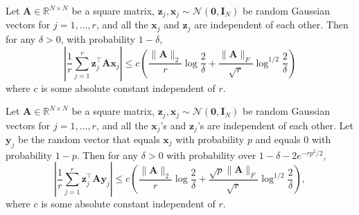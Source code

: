 \documentclass[10pt,a4paper]{amsart}
\newcommand{\B}{\mathbf}
\begin{document}
\begin{lemma}\label{lm:off} Let $\B{A}\in \mathbb{R}^{N \times N}$ be a square matrix, $\B{z}_j, \B{x}_j\sim \mathcal{N}(\B{0},\B{I}_N)$ be random Gaussian vectors for $j=1,\ldots,r$, and all the $\B{x}_j$ and $\B{z}_j$ are independent of each other. Then for any $\delta > 0$, with probability $1-\delta$,
\[
\left|\frac{1}{r} \sum\limits_{j=1}^{r} \B{z}_j^{\top}\B{A}\B{x}_j \right| \leq c \left( \frac{\|\B{A}\|_2}{r}\log \frac{2}{\delta} + \frac{\|\B{A}\|_F}{\sqrt r}\log^{1/2} \frac{2}{\delta}\right)
\]
where $c$ is some absolute constant independent of $r$.
\end{lemma}

\begin{lemma}\label{lm:off2} Let $\B{A}\in \mathbb{R}^{N \times N}$ be a square matrix, $\B{z}_j, \B{x}_j\sim \mathcal{N}(\B{0},\B{I}_N)$ be random Gaussian vectors for $j=1,\ldots,r$, and all the $\B{x}_j$'s and $\B{z}_j$'s are independent of each other. Let $\B{y}_j$ be the random vector that equals $\B{x}_j$ with probability $p$ and equals $0$ with probability $1-p$. Then for any $\delta>0$ with probability over $1-\delta-2e^{-rp^2/2}$,
\[
\left|\frac{1}{r} \sum\limits_{j=1}^{r} \B{z}_j^{\top}\B{A}\B{y}_j \right| \leq c \left( \frac{\|\B{A}\|_2}{r}\log \frac{2}{\delta} + \frac{\sqrt p \|\B{A}\|_F}{\sqrt r}\log^{1/2} \frac{2}{\delta}\right),
\]
where $c$ is some absolute constant independent of $r$.
\end{lemma}
\end{document}
